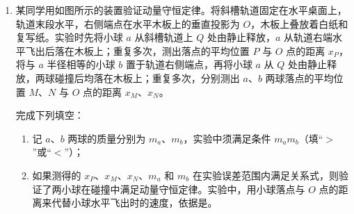 \documentclass[\gkver]{gaokaozhenti}
\begin{document}
\begin{enumerate}
{故选 AD。
}

\item
某同学用如图所示的装置验证动量守恒定律。将斜槽轨道固定在水平桌面上，轨道末段水平，右侧端点在水平木板上的垂直投影为 $O$，木板上叠放着白纸和复写纸。实验时先将小球 $a$ 从斜槽轨道上 $Q$ 处由静止释放，$a$ 从轨道右端水平飞出后落在木板上；重复多次，测出落点的平均位置 $P$ 与 $O$ 点的距离 $x_{P}$，将与 $a$ 半径相等的小球 $b$ 置于轨道右侧端点，再将小球 $a$ 从 $Q$ 处由静止释放，两球碰撞后均落在木板上；重复多次，分别测出 $a$、$b$ 两球落点的平均位置 $M$、$N$ 与 $O$ 点的距离 $x_{M}$、$x_{N}$。

完成下列填空：
\begin{enumerate}
	\item
	记 $a$、$b$ 两球的质量分别为 $m_{a}$、$m_{b}$，实验中须满足条件 $m_{a}$\tkanswer{>}$m_{b}$（填“$>$”或“$<$”）；
	\item
	如果测得的 $x_{P}$、$x_{M}$、$x_{N}$、$m_{a}$ 和 $m_{b}$ 在实验误差范围内满足关系式\newline{}，则验证了两小球在碰撞中满足动量守恒定律。实验中，用小球落点与 $O$ 点的距离来代替小球水平飞出时的速度，依据是。
\end{enumerate}
\end{enumerate}
\end{document}
